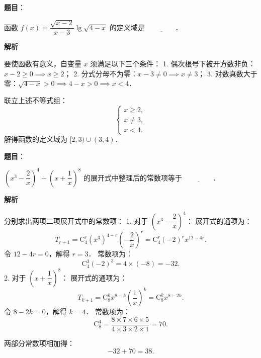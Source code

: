 \begin{answer}

\textbf{题目}：

函数 $f(x) = \dfrac{\sqrt{x - 2}}{x - 3}\lg\sqrt{4 - x}$ 的定义域是 $\underline{\qquad\qquad}$．

\textbf{解析}

要使函数有意义，自变量 $x$ 须满足以下三个条件：
1. 偶次根号下被开方数非负：$x - 2 \geqslant 0 \implies x \geqslant 2$；
2. 分式分母不为零：$x - 3 \neq 0 \implies x \neq 3$；
3. 对数真数大于零：$\sqrt{4 - x} > 0 \implies 4 - x > 0 \implies x < 4$．

联立上述不等式组：
\nopagebreak[4]
\[
\begin{cases}
x \geqslant 2, \\
x \neq 3, \\
x < 4.
\end{cases}
\]
解得函数的定义域为 $[2, 3) \cup (3, 4)$．

\gkanswer{答案：$[2, 3) \cup (3, 4)$（或 $\{x \mid 2 \leqslant x < 4 \text{ \text{且} } x \neq 3\}$）。}

\end{answer}
\begin{answer}

\textbf{题目}：

$\left(x^3 - \dfrac{2}{x}\right)^4 + \left(x + \dfrac{1}{x}\right)^8$ 的展开式中整理后的常数项等于 $\underline{\qquad\qquad}$．

\textbf{解析}

分别求出两项二项展开式中的常数项：
1. 对于 $\left(x^3 - \dfrac{2}{x}\right)^4$：
   展开式的通项为：
\nopagebreak[4]
\[
T_{r+1} = \mathrm{C}_4^r (x^3)^{4-r} \left(-\frac{2}{x}\right)^r = \mathrm{C}_4^r (-2)^r x^{12 - 4r}.
\]
   令 $12 - 4r = 0$，解得 $r = 3$．
   常数项为：
\nopagebreak[4]
\[
\mathrm{C}_4^3 (-2)^3 = 4 \times (-8) = -32.
\]
2. 对于 $\left(x + \dfrac{1}{x}\right)^8$：
   展开式的通项为：
\nopagebreak[4]
\[
T_{k+1} = \mathrm{C}_8^k x^{8-k} \left(\frac{1}{x}\right)^k = \mathrm{C}_8^k x^{8-2k}.
\]
   令 $8 - 2k = 0$，解得 $k = 4$．
   常数项为：
\nopagebreak[4]
\[
\mathrm{C}_8^4 = \frac{8 \times 7 \times 6 \times 5}{4 \times 3 \times 2 \times 1} = 70.
\]

两部分常数项相加得：
\nopagebreak[4]
\[
-32 + 70 = 38.
\]


\end{answer}
